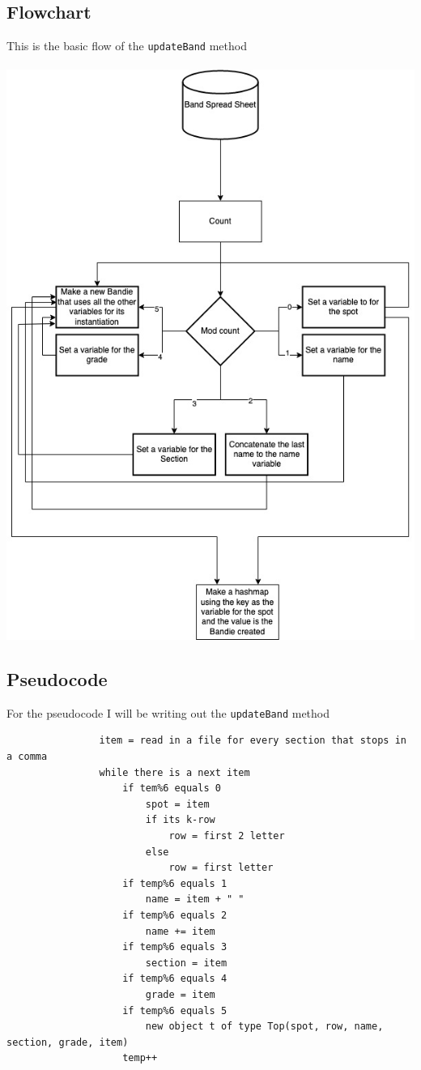 \documentclass{article}
\begin{document}
\subsection{Flowchart}
This is the basic flow of the \verb|updateBand| method \\ \\
\includegraphics[width=6in]{IA UML and Flowchart-Flowchart.jpg}
\subsection{Pseudocode}
For the pseudocode I will be writing out the \verb|updateBand| method
\begin{verbatim}
				item = read in a file for every section that stops in a comma
				while there is a next item
					if tem%6 equals 0 
						spot = item
						if its k-row
							row = first 2 letter
						else
							row = first letter
					if temp%6 equals 1
						name = item + " "
					if temp%6 equals 2
						name += item
					if temp%6 equals 3
						section = item
					if temp%6 equals 4
						grade = item
					if temp%6 equals 5
						new object t of type Top(spot, row, name, section, grade, item)
					temp++
\end{verbatim}
\end{document}
